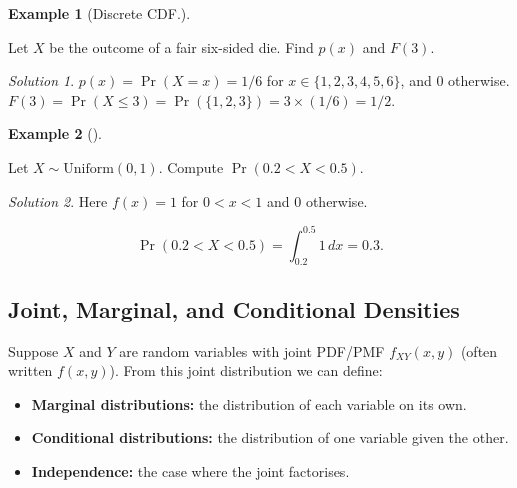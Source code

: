 \documentclass[
  letterpaper,
  DIV=11,
  numbers=noendperiod]{scrreprt}
\providecommand{\tightlist}{%
  \setlength{\itemsep}{0pt}\setlength{\parskip}{0pt}}
\theoremstyle{definition}
\newtheorem{example}{Example}[chapter]
\theoremstyle{plain}
\theoremstyle{definition}
\theoremstyle{remark}
\newtheorem{refsolution}{Solution}[chapter]
\begin{document}
\begin{example}[Discrete
CDF.]\protect\hypertarget{exm-discrete-cdf}{}\label{exm-discrete-cdf}

Let \(X\) be the outcome of a fair six-sided die. Find \(p(x)\) and
\(F(3)\).

\end{example}

\begin{refsolution}
\(p(x)=\Pr(X=x)=1/6\) for \(x\in\{1,2,3,4,5,6\}\), and \(0\)
otherwise.\\
\(F(3)=\Pr(X\le 3)=\Pr(\{1,2,3\})=3\times(1/6)=1/2.\)

\label{sol-discrete-cdf}

\end{refsolution}

\begin{example}[]\protect\hypertarget{exm-continuous-pdf}{}\label{exm-continuous-pdf}

Let \(X\sim \mathrm{Uniform}(0,1)\). Compute \(\Pr(0.2<X<0.5)\).

\end{example}

\begin{refsolution}
Here \(f(x)=1\) for \(0<x<1\) and \(0\) otherwise.

\[
\Pr(0.2<X<0.5)=\int_{0.2}^{0.5} 1\,dx = 0.3.
\]

\label{sol-continuous-pdf}

\end{refsolution}

\subsection{Joint, Marginal, and Conditional
Densities}\label{joint-marginal-and-conditional-densities}

Suppose \(X\) and \(Y\) are random variables with joint PDF/PMF
\(f_{XY}(x,y)\) (often written \(f(x,y)\)). From this joint distribution
we can define:

\begin{itemize}
\tightlist
\item
  \textbf{Marginal distributions:} the distribution of each variable on
  its own.\\
\item
  \textbf{Conditional distributions:} the distribution of one variable
  given the other.\\
\item
  \textbf{Independence:} the case where the joint factorises.
\end{itemize}
\end{document}
